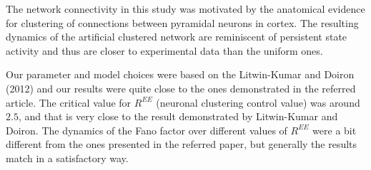 \documentclass[11pt]{article}
\begin{document}
The network connectivity in this study was motivated by the anatomical evidence for clustering of connections between pyramidal neurons in cortex. The resulting dynamics of the artificial clustered network are reminiscent of persistent state activity and thus are closer to experimental data than the uniform ones.

Our parameter and model choices were based on the Litwin-Kumar and Doiron (2012) and our results were quite close to the ones demonstrated in the referred article. The critical value for $R^{EE}$ (neuronal clustering control value) was around $2.5$, and that is very close to the result demonstrated by Litwin-Kumar and Doiron. The dynamics of the Fano factor over different values of $R^{EE}$ were a bit different from the ones presented in the referred paper, but generally the results match in a satisfactory way.
\end{document}
